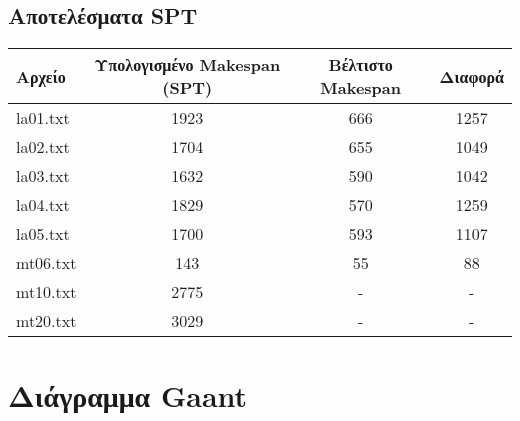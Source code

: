 \documentclass{article}
\begin{document}
\subsection{Αποτελέσματα SPT}

\begin{tabular}{ l c c c }
\hline
Αρχείο & Υπολογισμένο Makespan (SPT) & Βέλτιστο Makespan & Διαφορά \\
\hline
la01.txt & 1923 & 666 & 1257 \\
la02.txt & 1704 & 655 & 1049 \\
la03.txt & 1632 & 590 & 1042 \\
la04.txt & 1829 & 570 & 1259 \\
la05.txt & 1700 & 593 & 1107 \\
mt06.txt & 143 & 55 & 88 \\
mt10.txt & 2775 & - & - \\
mt20.txt & 3029 & - & - \\
\hline
\end{tabular}



\section{Διάγραμμα Gaant}
\end{document}
